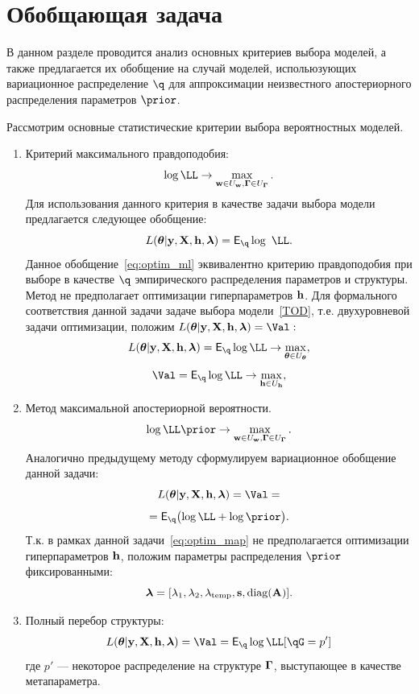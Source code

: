 \section{Обобщающая задача}
В данном разделе проводится анализ основных критериев выбора моделей, а также предлагается их обобщение на случай моделей, испольюзующих вариационное распределение $\q$ для аппроксимации неизвестного апостериорного распределения параметров $\prior$.

Рассмотрим основные статистические критерии выбора вероятностных моделей. 
\begin{enumerate}
\item Критерий максимального правдоподобия:
\[\log \LL \to \max_{\w \in \Uw, \G \in \UG}.\]
Для использования данного критерия в качестве задачи выбора модели предлагается следующее обобщение:
\begin{equation}
\label{eq:optim_ml}
    \Loss =  \E_{\q} \log~\LL.
\end{equation}
Данное обобщение~\eqref{eq:optim_ml} эквивалентно  критерию правдоподобия при выборе в качестве $\q$ эмпирического распределения параметров и структуры.
Метод не предполагает оптимизации гиперпараметров $\mathbf{h}$. Для формального соответствия данной задачи задаче выбора модели~\eqref{TOD}, т.е. двухуровневой задачи оптимизации, положим $\Loss=\Val:$
\[
    \Loss =  \E_{\q}\log \LL \to \max_{\teta \in \Uteta},
\]
\[
    \Val =  \E_{\q}\log \LL \to \max_{\h \in \Uh},
\]



\item Метод максимальной апостериорной вероятности. 
\[\log \LL \prior \to \max_{\w  \in \Uw, \G \in \UG}.\]
Аналогично предыдущему методу сформулируем вариационное обобщение данной задачи:
\begin{equation}
\label{eq:optim_map}
\Loss = \Val = 
\end{equation}
\[
 = \E_{\q} \bigl( \log\LL + \log\prior \bigr).
\]
Т.к. в рамках данной задачи~\eqref{eq:optim_map} не предполагается оптимизации гиперпараметров $\mathbf{h}$, положим параметры распределения $\prior$ фиксированными:
\[
   \boldsymbol{\lambda} = [\lambda_1, \lambda_2, \lambda_{\text{temp}}, \mathbf{s}, \text{diag}(\mathbf{A})].
\]

\item Полный перебор структуры:
\begin{equation}
\label{eq:optim_struct}
    \Loss = \Val = \E_{\q} \log \LL [\qG = p']
\end{equation}
где $p'$ --- некоторое распределение на структуре $\boldsymbol{\Gamma}$, выступающее в качестве метапараметра.





\end{enumerate}
